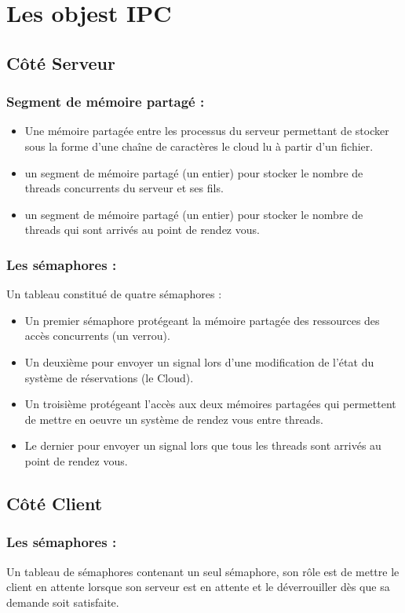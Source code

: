 \documentclass[oneside,13pt,a4paper]{article}
\begin{document}
\section{Les objest IPC  }
\subsection{Côté Serveur  }
\subsubsection{Segment de mémoire partagé : }
\begin{itemize}
	\item Une mémoire partagée entre les processus du serveur permettant de stocker sous la forme d'une chaîne de caractères le cloud lu à partir d'un fichier.
	\item un segment de mémoire partagé (un entier) pour stocker le nombre de threads concurrents du serveur et ses fils.
	\item un segment de mémoire partagé (un entier) pour stocker le nombre de threads qui sont arrivés au point de rendez vous.
\end{itemize}


\subsubsection{Les sémaphores :}
Un tableau constitué de quatre sémaphores : 
\begin{itemize}
	\item Un premier sémaphore protégeant la mémoire partagée des ressources des accès concurrents (un verrou).
	\item Un deuxième pour envoyer un signal lors d'une modification de l'état du système de réservations (le Cloud).
	\item Un troisième protégeant l'accès aux deux mémoires partagées qui permettent de mettre en oeuvre un système de rendez vous entre threads.
	\item Le dernier pour envoyer un signal lors que tous les threads sont arrivés au point de rendez vous.
\end{itemize}



\subsection{Côté Client  }
\subsubsection{Les sémaphores :}
Un tableau de sémaphores contenant un seul sémaphore, son rôle est de mettre le client en attente lorsque son serveur est en attente et le déverrouiller dès que sa demande soit satisfaite.
\end{document}
